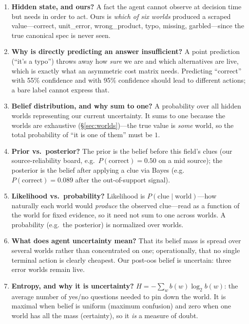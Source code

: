 \documentclass[11pt]{article}
\newcommand{\pcorrect}{P(\text{correct})}
\begin{document}
\begin{enumerate}[itemsep=3pt]
\item \textbf{Hidden state, and ours?} A fact the agent cannot observe at decision
time but needs in order to act. Ours is \emph{which of six worlds} produced a scraped
value---\textsf{correct}, \textsf{unit\_error}, \textsf{wrong\_product}, \textsf{typo},
\textsf{missing}, \textsf{garbled}---since the true canonical spec is never seen.

\item \textbf{Why is directly predicting an answer insufficient?} A point prediction
(``it's a typo'') throws away how \emph{sure} we are and which alternatives are live,
which is exactly what an asymmetric cost matrix needs. Predicting ``correct'' with 55\%
confidence and with 95\% confidence should lead to different actions; a bare label
cannot express that.

\item \textbf{Belief distribution, and why sum to one?} A probability over all hidden
worlds representing our current uncertainty. It sums to one because the worlds are
exhaustive (\S\ref{sec:worlds})---the true value is \emph{some} world, so the total
probability of ``it is one of them'' must be $1$.

\item \textbf{Prior vs.\ posterior?} The prior is the belief before this field's clues
(our source-reliability board, e.g.\ $\pcorrect=0.50$ on a mid source); the posterior
is the belief after applying a clue via Bayes (e.g.\ $\pcorrect=0.089$ after the
out-of-support signal).

\item \textbf{Likelihood vs.\ probability?} Likelihood is $P(\text{clue}\mid
\text{world})$---how naturally each world would \emph{produce} the observed clue---read
as a function of the world for fixed evidence, so it need not sum to one across worlds.
A probability (e.g.\ the posterior) is normalized over worlds.

\item \textbf{What does agent uncertainty mean?} That its belief mass is spread over
several worlds rather than concentrated on one; operationally, that no single terminal
action is clearly cheapest. Our post-oos belief is uncertain: three error worlds remain
live.

\item \textbf{Entropy, and why it is uncertainty?} $H=-\sum_w b(w)\log_2 b(w)$: the
average number of yes/no questions needed to pin down the world. It is maximal when
belief is uniform (maximum confusion) and zero when one world has all the mass
(certainty), so it \emph{is} a measure of doubt.


\end{enumerate}
\end{document}
